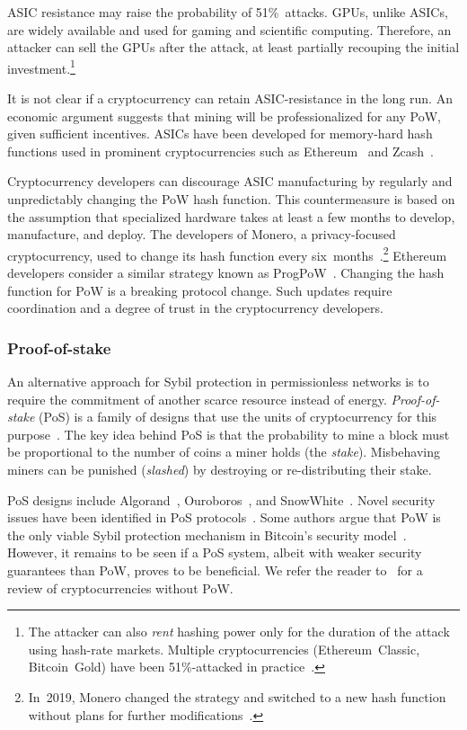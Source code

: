 ASIC resistance may raise the probability of 51\%~attacks.
GPUs, unlike ASICs, are widely available and used for gaming and scientific computing.
Therefore, an attacker can sell the GPUs after the attack, at least partially recouping the initial investment.\footnote{The attacker can also \textit{rent} hashing power only for the duration of the attack using hash-rate markets. Multiple cryptocurrencies (Ethereum~Classic, Bitcoin~Gold) have been 51\%-attacked in practice~\cite{Xazax3102019}.}

It is not clear if a cryptocurrency can retain ASIC-resistance in the long run.
An economic argument suggests that mining will be professionalized for any PoW, given sufficient incentives.
ASICs have been developed for memory-hard hash functions used in prominent cryptocurrencies such as Ethereum~\cite{OLeary2018} and Zcash~\cite{Floyd2018}.

Cryptocurrency developers can discourage ASIC manufacturing by regularly and unpredictably changing the PoW hash function.
This countermeasure is based on the assumption that specialized hardware takes at least a few months to develop, manufacture, and deploy.
The developers of Monero, a privacy-focused cryptocurrency, used to change its hash function every six~months~\cite{Kim2019}.\footnote{In~2019, Monero changed the strategy and switched to a new hash function without plans for further modifications~\cite{dEBRUYNE2019}.}
Ethereum developers consider a similar strategy known as ProgPoW~\cite{OLeary2019}.
Changing the hash function for PoW is a breaking protocol change.
Such updates require coordination and a degree of trust in the cryptocurrency developers.


\subsubsection*{Proof-of-stake}

An alternative approach for Sybil protection in permissionless networks is to require the commitment of another scarce resource instead of energy.
\textit{Proof-of-stake} (PoS) is a family of designs that use the units of cryptocurrency for this purpose~\cite{Bano2019}.
The key idea behind PoS is that the probability to mine a block must be proportional to the number of coins a miner holds (the \textit{stake}).
Misbehaving miners can be punished (\textit{slashed}) by destroying or re-distributing their stake.


PoS designs include Algorand~\cite{Chen2019}, Ouroboros~\cite{Kiayias2017}, and SnowWhite~\cite{Bentov2016a}.
Novel security issues have been identified in PoS protocols~\cite{Fanti2019,Gazi2018,BrownCohen2019,Chitra2020}.
Some authors argue that PoW is the only viable Sybil protection mechanism in Bitcoin's security model~\cite{Andreev2014, Sztorc2015, Poelstra2015}.
However, it remains to be seen if a PoS system, albeit with weaker security guarantees than PoW, proves to be beneficial.
We refer the reader to~\cite{Bentov2016} for a review of cryptocurrencies without PoW.


